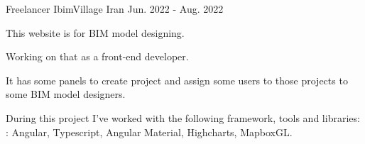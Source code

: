 \begin{cventries}
	\cventry
	{Freelancer} %
	{IbimVillage} %
	{Iran} %
	{Jun. 2022 - Aug. 2022} %
	{
		\begin{cvitems} %
			\item {This website is for BIM model designing.}
			\item {Working on that as a front-end developer.}
			\item {It has some panels to create project and assign some users to those projects to some BIM model designers.}
			\item {During this project I've worked with the following framework, tools and libraries: : Angular, Typescript, Angular Material, Highcharts, MapboxGL.}
		\end{cvitems}
	}

\end{cventries}
